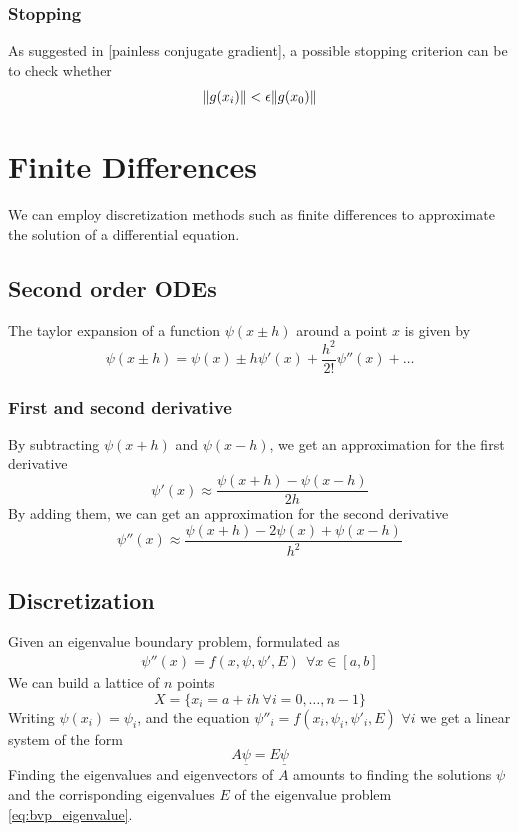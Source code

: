 \documentclass{article}
\begin{document}
\subsubsection{Stopping}
As suggested in [painless conjugate gradient], a possible stopping criterion can be to check whether 
\begin{equation}
    \norm{g(x_i)} < \epsilon \norm{g(x_0)}
\end{equation}

\section{Finite Differences}
We can employ discretization methods such as finite differences to approximate the solution of a differential equation.
\subsection{Second order ODEs}
The taylor expansion of a function $\psi(x\pm h)$ around a point $x$ is given by
\begin{equation}
    \psi(x\pm h) = \psi(x) \pm h \psi'(x) + \frac{h^2}{2!} \psi''(x) + \ldots
\end{equation}
\subsubsection{First and second derivative}
By subtracting $\psi(x+h)$ and $\psi(x-h)$, we get an approximation for the first derivative
\begin{equation}
    \psi'(x) \approx \frac{\psi(x+h) - \psi(x-h)}{2h}
\end{equation}
By adding them, we can get an approximation for the second derivative
\begin{equation}
    \psi''(x) \approx \frac{\psi(x+h) - 2\psi(x) + \psi(x-h)}{h^2} \label{eq:finite_diff_2nd}
\end{equation}
\subsection{Discretization}
Given an eigenvalue boundary problem, formulated as
\begin{align}
    \psi''(x)  = f(x, \psi, \psi', E) \ \ \forall x \in [a, b] \label{eq:bvp_eigenvalue}
\end{align}
We can build a lattice of $n$ points
\begin{equation} 
    X = \{x_i = a + ih \ \forall i = 0, \ldots, n-1\}
\end{equation}
Writing $\psi(x_i) = \psi_i$, and the equation $\psi''_i = f(x_i, \psi_i, \psi'_i, E)$ $\forall i$ we get a linear system of the form
\begin{equation}
    A \underline{\psi} = E\underline{\psi}
\end{equation}
Finding the eigenvalues and eigenvectors of $A$ amounts to finding the solutions $\psi$ and the corrisponding eigenvalues $E$ of the eigenvalue problem \ref{eq:bvp_eigenvalue}.
\end{document}
